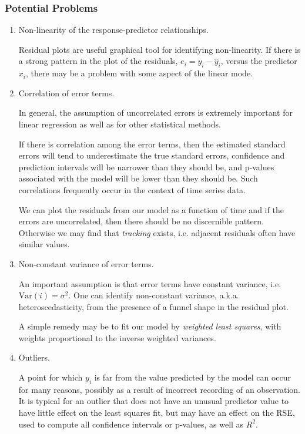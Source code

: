 \documentclass{article}
\begin{document}
\subsubsection{Potential Problems}
\begin{enumerate}
    \item Non-linearity of the response-predictor relationships.
    
        Residual plots are useful graphical tool for identifying non-linearity. If there is a strong pattern in the  plot of the residuals, $e_i = y_i - \hat y_i$, versus the predictor $x_i$, there may be a problem with some aspect of the linear mode.
    
    \item Correlation of error terms.
    
         In general, the assumption of uncorrelated errors is extremely important for linear regression as well as for other statistical methods.
        
        If there is correlation among the error terms, then the estimated standard errors will tend to underestimate the true standard errors, confidence and prediction intervals will be narrower than they should be, and p-values associated with the model will be lower than they should be.  Such correlations frequently occur in the context of time series data.
        
        We can plot the residuals from our model as a function of time and if the errors are uncorrelated, then there should be no discernible pattern. Otherwise we may find that \textit{tracking} exists, i.e. adjacent residuals often have similar values.
    
    \item Non-constant variance of error terms.
        
        An important assumption is that error terms have constant variance, i.e. $ \text{Var}(i) = \sigma^2$.  One can identify non-constant variance, a.k.a. heteroscedasticity, from the presence of a funnel shape in the residual plot.
        
        A simple remedy may be to fit our model by \textit{weighted least squares}, with weights proportional to the inverse weighted variances.
    
    \item Outliers.
    
    A point for which $y_i$ is far from the value predicted by the model can occur for many reasons, possibly as a result  of incorrect recording of an observation.
    It is typical for an outlier that does not have an unusual predictor value to have little effect on the least squares fit, but may have an effect on the RSE, used to compute all confidence intervals or p-values, as well as $R^2$. 
    

\end{enumerate}
\end{document}
